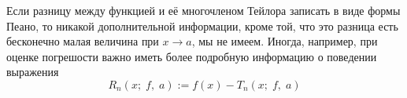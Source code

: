 

\label{sec_Definition16}
\begin{definition}
    Если разницу между функцией и её многочленом Тейлора записать в виде формы Пеано,
    то никакой дополнительной информации, кроме той, что это разница есть
    бесконечно малая величина при $x \rightarrow a$, мы не имеем. Иногда, например, 
    при оценке погрешости важно иметь более подробную информацию о поведении выражения
    $$ R_n (x; \; f, \; a) := f(x) - T_n (x; \; f, \; a) $$
\end{definition}
